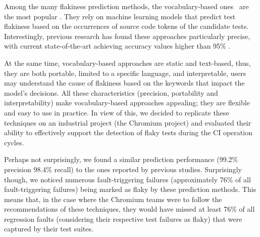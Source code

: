 Among the many flakiness prediction methods, the vocabulary-based ones~\cite{Haben2021,Pinto2020,Camara2021VocabExtendedReplication,Bertolino2020,olewickiBrown} are the most popular \cite{ParryKHM22}. They rely on machine learning models that predict test flakiness based on the occurrences of source code tokens of the candidate tests. Interestingly, previous research has found these approaches particularly precise, with current state-of-the-art achieving accuracy values higher than 95\% \cite{Pinto2020,fatima2021flakify,camara2021use,Camara2021VocabExtendedReplication,Haben2021}. 

At the same time, vocabulary-based approaches are static and text-based, thus, they are both portable, \ie limited to a specific language, and interpretable, \ie users may understand the cause of flakiness based on the keywords that impact the model's decisions. All these characteristics (precision, portability and interpretability) make vocabulary-based approaches appealing; they are flexible and easy to use in practice. In view of this, we decided to replicate these techniques on an industrial project (the Chromium project) and evaluated their ability to effectively support the detection of flaky tests during the CI operation cycles. %

Perhaps not surprisingly, we found a similar prediction performance (99.2\% precision 98.4\% recall) to the ones reported by previous studies. Surprisingly though, we noticed numerous fault-triggering failures (approximately 76\% of all fault-triggering failures) being marked as flaky by these prediction methods. This means that, in the case where the Chromium teams were to follow the recommendations of these techniques, they would have missed at least 76\% of all regression faults (considering their respective test failures as flaky) that were captured by their test suites. 

